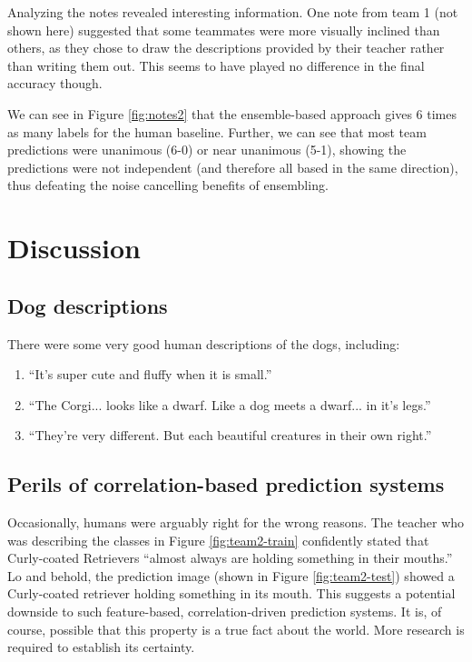 \documentclass[sigplan,10pt]{acmart}
\begin{document}
Analyzing the notes revealed interesting information. One note from team 1 (not shown here) suggested that some teammates were more visually inclined than others, as they chose to draw the descriptions provided by their teacher rather than writing them out. This seems to have played no difference in the final accuracy though.

We can see in Figure \ref{fig:notes2} that the ensemble-based approach gives 6 times as many labels for the human baseline. 
Further, we can see that most team predictions were unanimous (6-0) or near unanimous (5-1), showing the predictions were not independent (and therefore all based in the same direction), thus defeating the noise cancelling benefits of ensembling.

\section{Discussion}
\subsection{Dog descriptions}
There were some very good human descriptions of the dogs, including:
\begin{enumerate}
    \item ``It's super cute and fluffy when it is small.''
    \item ``The Corgi... looks like a dwarf. Like a dog meets a dwarf... in it's legs.''
    \item ``They're very different. But each beautiful creatures in their own right.''
\end{enumerate}


\subsection{Perils of correlation-based prediction systems}
Occasionally, humans were arguably right for the wrong reasons. The teacher who was describing the classes in Figure \ref{fig:team2-train} confidently stated that Curly-coated Retrievers ``almost always are holding something in their mouths.'' Lo and behold, the prediction image (shown in Figure \ref{fig:team2-test}) showed a Curly-coated retriever holding something in its mouth. This suggests a potential downside to such feature-based, correlation-driven prediction systems. It is, of course, possible that this property is a true fact about the world. More research is required to establish its certainty.
\end{document}
